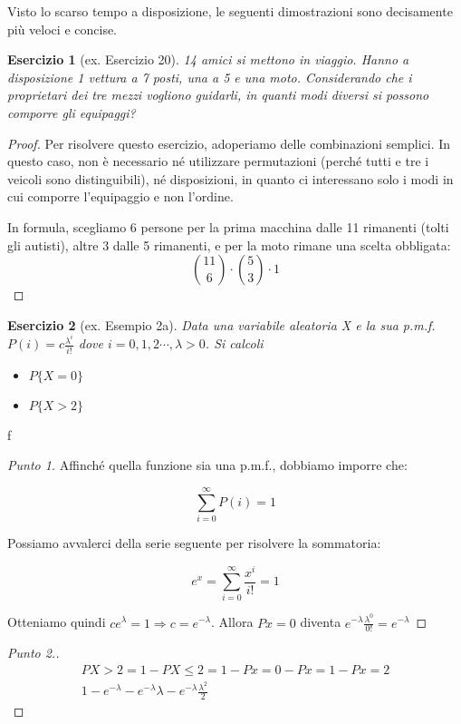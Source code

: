 \documentclass[12pt]{article}
\newtheorem{theorem}{Esercizio}
\renewcommand\qedsymbol{$\square$}
\begin{document}
Visto lo scarso tempo a disposizione, le seguenti dimostrazioni sono decisamente più veloci e concise.

\begin{theorem}[ex. Esercizio 20]
	14 amici si mettono in viaggio. Hanno a disposizione 1 vettura a 7 posti, una a 5 e una moto. Considerando che i proprietari dei tre mezzi vogliono guidarli, in quanti modi diversi si possono comporre gli equipaggi?
\end{theorem}

\begin{proof}
	Per risolvere questo esercizio, adoperiamo delle combinazioni semplici. In questo caso, non è necessario né utilizzare permutazioni (perché tutti e tre i veicoli sono distinguibili), né disposizioni, in quanto ci interessano solo i modi in cui comporre l'equipaggio e non l'ordine.
	
	In formula, scegliamo 6 persone per la prima macchina dalle 11 rimanenti (tolti gli autisti), altre 3 dalle 5 rimanenti, e per la moto rimane una scelta obbligata:
	\[
		\binom{11}{6} \cdot \binom{5}{3} \cdot 1
    \]
\end{proof}

\renewcommand\qedsymbol{$\square$}

\begin{theorem}[ex. Esempio 2a]
	Data una variabile aleatoria X e la sua p.m.f. $P(i) = c \frac{\lambda^i}{i!}$ dove $i = 0, 1, 2 \cdots, \lambda > 0$. Si calcoli
	\begin{itemize}
		\item $P\{X=0\}$
		\item $P\{X>2\}$
	\end{itemize}
\end{theorem}
f
\begin{proof}[Punto 1]
	Affinché quella funzione sia una p.m.f., dobbiamo imporre che:

	\[
		\sum_{i = 0}^{\infty} P(i) = 1
    \]

	Possiamo avvalerci della serie seguente per risolvere la sommatoria:

	\[
		e^x = \sum_{i = 0}^{\infty} \frac{x^i}{i!}= 1
	\]

	Otteniamo quindi $ce^\lambda = 1 \Rightarrow c = e^{-\lambda}$. Allora $P{x = 0}$ diventa $e^{-\lambda}\frac{\lambda^0}{0!} = e^{-\lambda}$
\end{proof}

\renewcommand\qedsymbol{$\blacksquare$}

\begin{proof}[Punto 2.]
	\begin{gather*}
		P{X > 2} = 1 - P{X \le 2} = 1 - P{x = 0} - P{x = 1} - P{x = 2} \\
		1 - e^{-\lambda} - e^{-\lambda}\lambda  - e^{-\lambda}	\frac{\lambda^2}{2}
	\end{gather*}
\end{proof}
\end{document}

